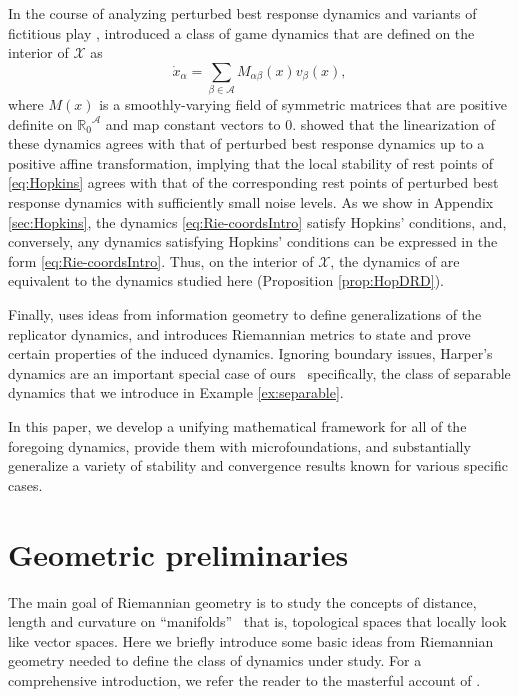 \documentclass[reqno]{amsart}
\theoremstyle{plain}
\theoremstyle{definition}
\theoremstyle{remark}
\numberwithin{equation}{section}
\numberwithin{theorem}{section}
\begin{document}
In the course of analyzing perturbed best response dynamics \citep{FL98} and variants of fictitious play \citep{Bro49,Bro51}, \cite{Hop99b} introduced a class of game dynamics that are defined on the interior of ${\mathcal{X}}$ as
\begin{equation}
\label{eq:Hopkins}
\dot x_{\alpha}
	= \sum_{\beta\in{\mathcal{A}}} {M}_{\alpha\beta}(x){v}_{\beta}(x),
\end{equation}
where ${M}(x)$ is a smoothly-varying field of symmetric matrices that are positive definite on ${{\mathbb{R}}_{0}}^{\mathcal{A}}$ and map constant vectors to $0$.
\cite{Hop99b} showed that the linearization of these dynamics agrees with that of perturbed best response dynamics up to a positive affine transformation, implying that the local stability of rest points of \eqref{eq:Hopkins} agrees with that of the corresponding rest points of perturbed best response dynamics with sufficiently small noise levels. 
As we show in Appendix \ref{sec:Hopkins}, the dynamics \eqref{eq:Rie-coordsIntro} satisfy Hopkins' conditions, and, conversely, any dynamics satisfying Hopkins' conditions can be expressed in the form \eqref{eq:Rie-coordsIntro}.
Thus, on the interior of ${\mathcal{X}}$, the dynamics of \cite{Hop99b} are equivalent to the dynamics studied here (Proposition \ref{prop:HopDRD}).

Finally, \cite{Har11} uses ideas from information geometry to define generalizations of the replicator dynamics, and introduces Riemannian metrics to state and prove certain properties of the induced dynamics.
Ignoring boundary issues, Harper's dynamics are an important special case of ours \textendash\ specifically, the class of separable dynamics that we introduce in Example \ref{ex:separable}.

In this paper, we develop a unifying mathematical framework for all of the foregoing dynamics, provide them with microfoundations, and substantially generalize a variety of stability and convergence results known for various specific cases.

\section{Geometric preliminaries}
\label{sec:Riemannian}

The main goal of Riemannian geometry is to study the concepts of distance, length and curvature on ``manifolds'' \textendash\ that is, topological spaces that locally look like vector spaces.
Here we briefly introduce some basic ideas from Riemannian geometry needed to define the class of dynamics under study.
For a comprehensive introduction, we refer the reader to the masterful account of \cite{Lee97,Lee03}.
\end{document}
